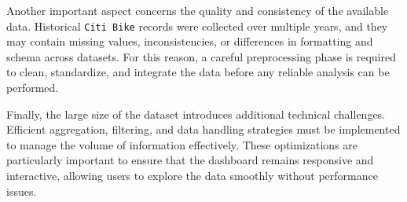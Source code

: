 Another important aspect concerns the quality and consistency of the available data. Historical \texttt{Citi Bike} records were collected over multiple years, 
and they may contain missing values, inconsistencies, or differences in formatting and schema across datasets. For this reason, a careful preprocessing phase is required to clean, 
standardize, and integrate the data before any reliable analysis can be performed.

Finally, the large size of the dataset introduces additional technical challenges. Efficient aggregation, filtering, 
and data handling strategies must be implemented to manage the volume of information effectively. 
These optimizations are particularly important to ensure that the dashboard remains responsive and interactive, allowing users to explore the data smoothly without performance issues.

